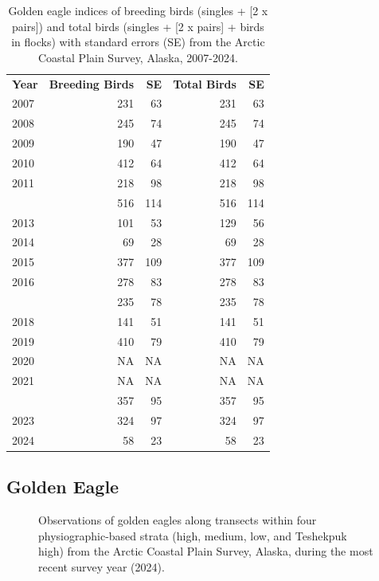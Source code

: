 \documentclass[
]{article}
\begin{document}
\begin{longtable}[t]{lrrrr}

\caption{\label{tbl-GOEA}Golden eagle indices of breeding birds (singles
+ {[}2 x pairs{]}) and total birds (singles + {[}2 x pairs{]} + birds in
flocks) with standard errors (SE) from the Arctic Coastal Plain Survey,
Alaska, 2007-2024.}

\tabularnewline

\\
\toprule
\textbf{Year} & \textbf{Breeding Birds} & \textbf{SE} & \textbf{Total Birds} & \textbf{SE}\\
\midrule
2007 & 231 & 63 & 231 & 63\\
2008 & 245 & 74 & 245 & 74\\
2009 & 190 & 47 & 190 & 47\\
2010 & 412 & 64 & 412 & 64\\
2011 & 218 & 98 & 218 & 98\\
\addlinespace
2012 & 516 & 114 & 516 & 114\\
2013 & 101 & 53 & 129 & 56\\
2014 & 69 & 28 & 69 & 28\\
2015 & 377 & 109 & 377 & 109\\
2016 & 278 & 83 & 278 & 83\\
\addlinespace
2017 & 235 & 78 & 235 & 78\\
2018 & 141 & 51 & 141 & 51\\
2019 & 410 & 79 & 410 & 79\\
2020 & NA & NA & NA & NA\\
2021 & NA & NA & NA & NA\\
\addlinespace
2022 & 357 & 95 & 357 & 95\\
2023 & 324 & 97 & 324 & 97\\
2024 & 58 & 23 & 58 & 23\\
\bottomrule

\end{longtable}

\endgroup{}

\newpage{}

\subsection*{Golden Eagle}\label{golden-eagle-2}

\begin{figure}


\caption{\label{fig-GOEAmap}Observations of golden eagles along
transects within four physiographic-based strata (high, medium, low, and
Teshekpuk high) from the Arctic Coastal Plain Survey, Alaska, during the
most recent survey year (2024).}

\end{figure}%
\end{document}
